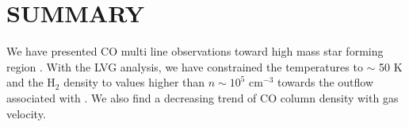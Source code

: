 \section{SUMMARY}\label{summary}

We have presented CO multi line observations toward high mass star forming region . With the LVG analysis, we have constrained the temperatures to $\sim$ 50 K and the H$_2$ density to values higher than $n \sim 10^5$ cm$^{-3}$ towards the outflow associated with . We also find a decreasing trend of CO column density with gas velocity. 